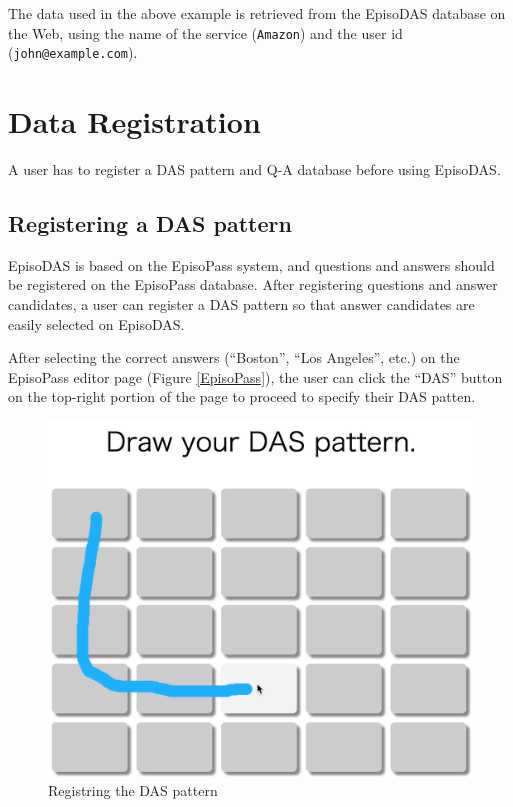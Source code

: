 \documentclass[sigconf]{acmart}
\begin{document}
The data used in the above example is retrieved from the EpisoDAS database
on the Web, using the name of the service (\texttt{Amazon})
and the user id (\texttt{john@example.com}).

\section{Data Registration}

A user has to register a DAS pattern and
Q-A database before using EpisoDAS.

\subsection{Registering a DAS pattern}

EpisoDAS is based on the EpisoPass system,
and questions and answers should be registered on the EpisoPass database.
After registering questions and answer candidates,
a user can register a DAS pattern so that
answer candidates are easily selected on EpisoDAS.


After selecting the correct answers
(``Boston'', ``Los Angeles'', etc.) on the EpisoPass editor page (Figure \ref{EpisoPass}),
the user can click the ``DAS'' button on the top-right portion of the
page to proceed to specify their DAS patten.

\begin{figure}[H]
  \includegraphics[width=12cm,bb=0 0 1332 1118]{figures/DASRegister.png}
  \caption{Registring the DAS pattern}
  \label{DASRegister}
\end{figure}
\end{document}
